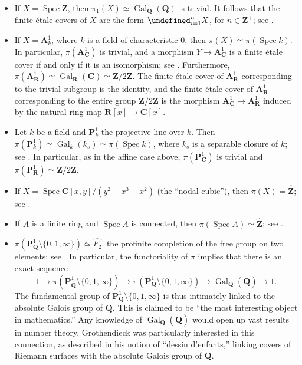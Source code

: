 \documentclass[11pt,openany]{book} %
\newcommand{\R}{\mathbf{R}}
\newcommand{\Z}{\mathbf{Z}}
\newcommand{\Q}{\mathbf{Q}}
\newcommand{\C}{\mathbf{C}}
\newcommand{\spc}{\operatorname{Spec}}
\let\coprod=\undefined
\begin{document}
\begin{example}
\begin{itemize}
    \item If $X = \spc \Z$, then $\pi_1(X) \simeq \operatorname{Gal}_{\Q}(\Q)$ is trivial. It follows that the finite \'etale covers of $X$ are the form $\coprod_{i=1}^{n} X$, for $n \in \Z^+$; see \cite{lenstra}.
    \item If $X = \mathbf{A}_{k}^1$, where $k$ is a field of characteristic $0$, then $\pi(X) \simeq \pi(\spc k)$. In particular, $\pi(\mathbf{A}_{\C}^1)$ is trivial, and a morphism $Y \to \mathbf{A}_{\C}^1$ is a finite \'etale cover if and only if it is an isomorphism; see \cite{tsimerman}. Furthermore, $\pi(\mathbf{A}_{\R}^1) \simeq \operatorname{Gal}_{\R}(\C) \simeq \Z/2\Z$. The finite \'etale cover of $\mathbf{A}_{\R}^1$ corresponding to the trivial subgroup is the identity, and the finite \'etale cover of $\mathbf{A}_{\R}^1$ corresponding to the entire group $\Z/2\Z$ is the morphism $\mathbf{A}_{\C}^1 \to \mathbf{A}_{\R}^1$ induced by the natural ring map $\R[x] \to \C[x]$.
    \item Let $k$ be a field and $\mathbf{P}_k^1$ the projective line over $k$. Then $\pi(\mathbf{P}_k^1) \simeq \operatorname{Gal}_k(k_s) \simeq \pi(\spc k)$, where $k_s$ is a separable closure of $k$; see \cite{lenstra}. In particular, as in the affine case above, $\pi(\mathbf{P}_{\C}^1)$ is trivial and $\pi(\mathbf{P}_{\R}^1) \simeq \Z/2\Z$.
    \item If $X = \spc \C[x,y]/(y^2 - x^3 - x^2)$ (the ``nodal cubic''), then $\pi(X) = \hat{\Z}$; see \cite{tsimerman}.
    \item If $A$ is a finite ring and $\spc A$ is connected, then $\pi(\spc A) \simeq \hat{\Z}$; see \cite{lenstra}.
    \item $\pi(\mathbf{P}_{\Q}^1 \setminus \{0,1,\infty\}) \simeq \hat{F_2}$, the profinite completion of the free group on two elements; see \cite{milne}. In particular, the functoriality of $\pi$ implies that there is an exact sequence
    \[
    1 \to \pi(\mathbf{P}_{\overline{\Q}}^1 \setminus \{0,1,\infty\}) \to \pi(\mathbf{P}_{\Q}^1 \setminus \{0,1,\infty\}) \to \operatorname{Gal}_{\Q}({\overline{\Q}}) \to 1.
    \]
    The fundamental group of $\mathbf{P}_{\Q}^1 \setminus \{0,1,\infty\}$ is thus intimately linked to the absolute Galois group of $\Q$. This is claimed to be ``the most interesting object in mathematics.'' \cite{milne} Any knowledge of $\operatorname{Gal}_{\Q}({\overline{\Q}})$ would open up vast results in number theory. Grothendieck was particularly interested in this connection, as described in his notion of ``dessin d'enfants,'' linking covers of Riemann surfaces with the absolute Galois group of $\Q$.
\end{itemize}
\end{example}
\end{document}
